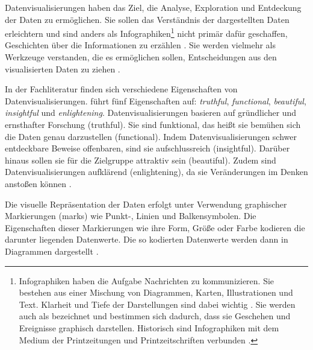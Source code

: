 Datenvisualisierungen haben das Ziel, die Analyse, Exploration und Entdeckung der Daten zu ermöglichen. Sie sollen das Verständnis der dargestellten Daten erleichtern
und sind anders als Infographiken\footnote{Infographiken haben die Aufgabe Nachrichten zu kommunizieren.
Sie bestehen aus einer Mischung von Diagrammen, Karten, Illustrationen und Text. Klarheit und Tiefe der Darstellungen sind dabei wichtig
\cite[vgl.][31]{cairo_truthful_2016}. Sie werden auch als 
bezeichnet und bestimmen sich dadurch, dass sie Geschehen und Ereignisse graphisch darstellen. 
Historisch sind Infographiken mit dem Medium der Printzeitungen und Printzeitschriften verbunden \cite[vgl.][27]{kirk_data_2019}.}
nicht primär dafür geschaffen, Geschichten über die Informationen zu erzählen \cite[vgl.][20 ff.]{kirk_data_2019}. 
Sie werden vielmehr als Werkzeuge verstanden, die es ermöglichen sollen, Entscheidungen aus den visualisierten Daten zu ziehen \cite[vgl.][31]{cairo_truthful_2016}. %

In der Fachliteratur finden sich verschiedene Eigenschaften von Datenvisualisierungen. 
führt fünf Eigenschaften auf: \textit{truthful}, \textit{functional}, \textit{beautiful}, \textit{insightful} und \textit{enlightening}.
Datenvisualisierungen basieren auf gründlicher und ernsthafter Forschung (truthful). Sie sind funktional, das heißt
sie bemühen sich die Daten genau darzustellen (functional). Indem Datenvisualisierungen schwer entdeckbare Beweise offenbaren, 
sind sie aufschlussreich (insightful). Darüber hinaus sollen sie für die Zielgruppe attraktiv sein (beautiful).
Zudem sind Datenvisualisierungen aufklärend (enlightening), da sie Veränderungen im Denken anstoßen können \cite[vgl.][45]{cairo_truthful_2016}. 

Die visuelle Repräsentation der Daten erfolgt unter Verwendung graphischer Markierungen (marks) wie Punkt-, 
Linien und Balkensymbolen. Die Eigenschaften dieser Markierungen wie ihre Form, Größe oder Farbe kodieren die
darunter liegenden Datenwerte. Die so kodierten Datenwerte werden dann in Diagrammen dargestellt \cite[vgl.][135 ff.]{kirk_data_2019}.

